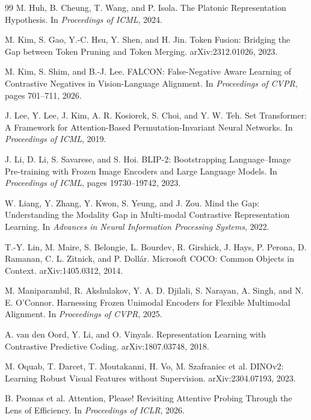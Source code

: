\begin{thebibliography}{99}
M. Huh, B. Cheung, T. Wang, and P. Isola.
\newblock The Platonic Representation Hypothesis.
\newblock In \emph{Proceedings of ICML}, 2024.

M. Kim, S. Gao, Y.-C. Hsu, Y. Shen, and H. Jin.
\newblock Token Fusion: Bridging the Gap between Token Pruning and Token Merging.
\newblock arXiv:2312.01026, 2023.

M. Kim, S. Shim, and B.-J. Lee.
\newblock FALCON: False-Negative Aware Learning of Contrastive Negatives in
Vision-Language Alignment.
\newblock In \emph{Proceedings of CVPR}, pages 701--711, 2026.

J. Lee, Y. Lee, J. Kim, A. R. Kosiorek, S. Choi, and Y. W. Teh.
\newblock Set Transformer: A Framework for Attention-Based
Permutation-Invariant Neural Networks.
\newblock In \emph{Proceedings of ICML}, 2019.

J. Li, D. Li, S. Savarese, and S. Hoi.
\newblock BLIP-2: Bootstrapping Language--Image Pre-training with Frozen Image
Encoders and Large Language Models.
\newblock In \emph{Proceedings of ICML}, pages 19730--19742, 2023.

W. Liang, Y. Zhang, Y. Kwon, S. Yeung, and J. Zou.
\newblock Mind the Gap: Understanding the Modality Gap in Multi-modal
Contrastive Representation Learning.
\newblock In \emph{Advances in Neural Information Processing Systems}, 2022.

T.-Y. Lin, M. Maire, S. Belongie, L. Bourdev, R. Girshick, J. Hays, P. Perona,
D. Ramanan, C. L. Zitnick, and P. Doll\'ar.
\newblock Microsoft COCO: Common Objects in Context.
\newblock arXiv:1405.0312, 2014.

M. Maniparambil, R. Akshulakov, Y. A. D. Djilali, S. Narayan, A. Singh, and
N. E. O'Connor.
\newblock Harnessing Frozen Unimodal Encoders for Flexible Multimodal Alignment.
\newblock In \emph{Proceedings of CVPR}, 2025.

A. van den Oord, Y. Li, and O. Vinyals.
\newblock Representation Learning with Contrastive Predictive Coding.
\newblock arXiv:1807.03748, 2018.

M. Oquab, T. Darcet, T. Moutakanni, H. Vo, M. Szafraniec et al.
\newblock DINOv2: Learning Robust Visual Features without Supervision.
\newblock arXiv:2304.07193, 2023.

B. Psomas et al.
\newblock Attention, Please! Revisiting Attentive Probing Through the Lens of
Efficiency.
\newblock In \emph{Proceedings of ICLR}, 2026.


\end{thebibliography}
